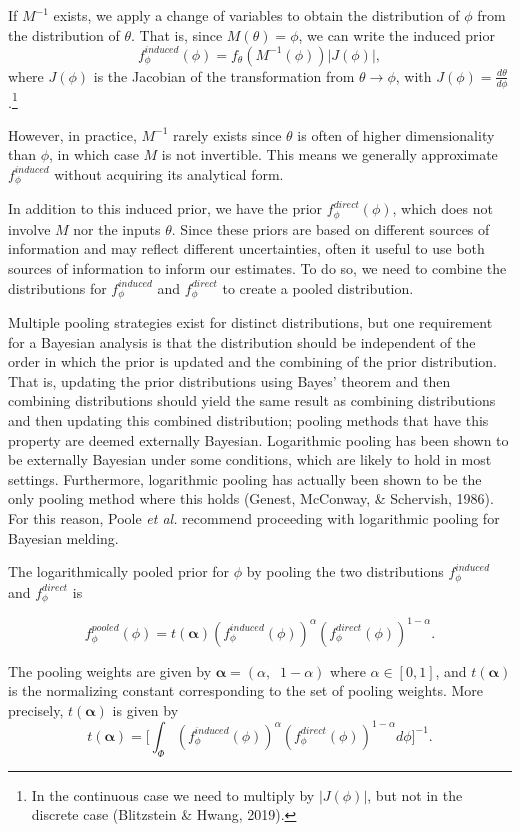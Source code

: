 \documentclass[12pt,twoside]{smiththesis}
\begin{document}
If \(M^{-1}\) exists, we apply a change of variables to obtain the distribution of \(\phi\) from the distribution of \(\theta\). That is, since \(M(\theta) =\phi\), we can write the induced prior \[f_\phi^{induced}(\phi) = f_\theta(M^{-1}(\phi)) |J(\phi)|, \tag{1}\] where \(J(\phi)\) is the Jacobian of the transformation from \(\theta \to \phi\), with \(J(\phi)=\frac{d\theta}{d\phi}\).\footnote{In the continuous case we need to multiply by \(|J(\phi)|\), but not in the discrete case (Blitzstein \& Hwang, 2019).}

However, in practice, \(M^{-1}\) rarely exists since \(\theta\) is often of higher dimensionality than \(\phi\), in which case \(M\) is not invertible. This means we generally approximate \(f_\phi^{induced}\) without acquiring its analytical form.

In addition to this induced prior, we have the prior \(f_\phi^{direct}(\phi)\), which does not involve \(M\) nor the inputs \(\theta\). Since these priors are based on different sources of information and may reflect different uncertainties, often it useful to use both sources of information to inform our estimates. To do so, we need to combine the distributions for \(f_\phi^{induced}\) and \(f_\phi^{direct}\) to create a pooled distribution.

Multiple pooling strategies exist for distinct distributions, but one requirement for a Bayesian analysis is that the distribution should be independent of the order in which the prior is updated and the combining of the prior distribution. That is, updating the prior distributions using Bayes' theorem and then combining distributions should yield the same result as combining distributions and then updating this combined distribution; pooling methods that have this property are deemed externally Bayesian. Logarithmic pooling has been shown to be externally Bayesian under some conditions, which are likely to hold in most settings. Furthermore, logarithmic pooling has actually been shown to be the only pooling method where this holds (Genest, McConway, \& Schervish, 1986). For this reason, Poole \emph{et al.} recommend proceeding with logarithmic pooling for Bayesian melding.

The logarithmically pooled prior for \(\phi\) by pooling the two distributions \(f_\phi^{induced}\) and \(f_\phi^{direct}\) is

\[f_\phi^{pooled} (\phi) = t(\boldsymbol{\alpha}) (f_\phi^{induced}(\phi))^{\alpha} (f_\phi^{direct}(\phi))^{1-\alpha}.\]

The pooling weights are given by \(\boldsymbol{\alpha} = (\alpha, \;\;1-\alpha)\) where \(\alpha \in [0,1]\), and \(t(\boldsymbol{\alpha})\) is the normalizing constant corresponding to the set of pooling weights. More precisely, \(t(\boldsymbol \alpha)\) is given by
\[t(\boldsymbol \alpha) = \Big[ \int_\Phi  (f_\phi^{induced}(\phi))^{\alpha} (f_\phi^{direct}(\phi))^{1-\alpha} d\phi \Big]^{-1}.\]
\end{document}
